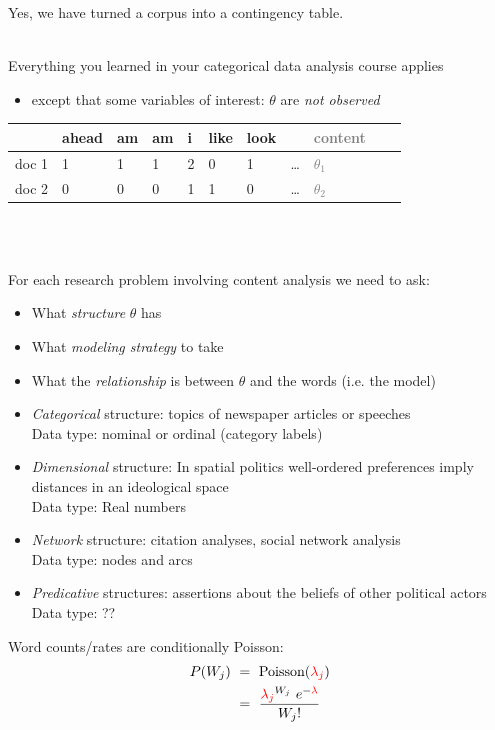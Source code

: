 \documentclass[11pt,compress,professionalfonts]{beamer}
\newcommand{\ita}{\begin{itemize}}
\newcommand{\itm}{\item[]}
\newcommand{\itz}{\end{itemize}}
\begin{document}

Yes, we have turned a corpus into a contingency table.

~\\
Everything you learned in your categorical data analysis course applies
\ita
\itm except that some variables of interest: $\theta$ are \textit{not observed}
\itz



\begin{center}
\small
\begin{tabular}{rllllllllll}\toprule
        & ahead & am & am & i & like & look &  & \textcolor{gray}{content} \\ \midrule
doc 1  & 1     & 1  & 1  & 2 & 0    & 1    & \ldots & \textcolor{gray}{$\theta_1$} \\
doc 2  & 0     & 0  & 0  & 1 & 1    & 0    & \ldots & \textcolor{gray}{$\theta_2$} \\ \bottomrule
\end{tabular} 
\normalsize
\end{center}
~\\\

For each research problem involving content analysis we need to ask:
\ita
\itm What \textit{structure} $\theta$ has
\itm What \textit{modeling strategy} to take
\itm What the \textit{relationship} is between $\theta$ and the words (i.e. the model)
\itz

 
\ita
\itm \textsl{Categorical} structure: topics of newspaper articles or speeches\\Data type: nominal or ordinal (category labels)
\itm \textsl{Dimensional} structure: In spatial politics well-ordered preferences imply distances in an ideological space\\Data type: Real numbers
\itm \textsl{Network} structure: citation analyses, social network analysis\\Data type: nodes and arcs
\itm \textsl{Predicative} structures: assertions about the beliefs of other political actors\\Data type: ??
\itz

 
Word counts/rates are conditionally Poisson:
\begin{align*}
P(W_j) &~=~ \text{Poisson}(\textcolor{red}{\lambda_{j}})\\
         &~=~ \frac{\textcolor{red}{\lambda_{j}}^{W_{j}}~e^{-\textcolor{red}{\lambda}}}{W_{j}!}
\end{align*}
\end{document}
